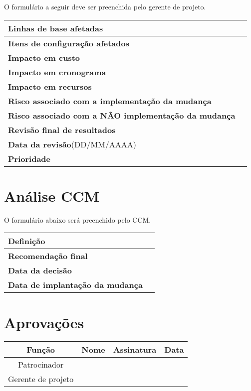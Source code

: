 O formulário a seguir deve ser preenchida pelo gerente de projeto.

\begin{table}[H]
	\begin{tabularx}{\textwidth}{| p{} | X |}
		\hline
		\textbf{Linhas de base afetadas} & \\
		\hline
		\textbf{Itens de configuração afetados} & \\
		\hline
        \textbf{Impacto em custo} & \\
		\hline
        \textbf{Impacto em cronograma} & \\
		\hline
        \textbf{Impacto em recursos} & \\
		\hline
        \textbf{Risco associado com a implementação da mudança} & \\
		\hline
        \textbf{Risco associado com a NÃO implementação da mudança} & \\
		\hline
        \textbf{Revisão final de resultados} & \\
		\hline
        \textbf{Data da revisão}(DD/MM/AAAA) & \\
		\hline
        \textbf{Prioridade} & \\
		\hline
	\end{tabularx}
	\centering
\end{table}

\section{Análise CCM}

O formulário abaixo será preenchido pelo CCM.

\begin{table}[H]
	\begin{tabularx}{\textwidth}{| p{} | X |}
		\hline
		\textbf{Definição} & \\
		\hline
		\textbf{Recomendação final} & \\
		\hline
        \textbf{Data da decisão} & \\
		\hline
        \textbf{Data de implantação da mudança} & \\
		\hline
	\end{tabularx}
	\centering
\end{table}

\section{Aprovações}

\begin{table}[H]
	\begin{tabularx}{\textwidth}{| c | c | X | c |}
		\hline
		\textbf{Função}  & \textbf{Nome}       & \textbf{Assinatura}      & \textbf{Data} \\
		\hline
		Patrocinador       & \projectSponsorName{} & \projectSponsorSignature{} &               \\
		\hline
		Gerente de projeto & \projectManagerName{} & \projectManagerSignature{} &               \\
		\hline
	\end{tabularx}
	\centering
\end{table}